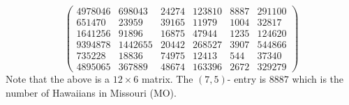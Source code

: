 \documentclass{ximera}
\begin{document}
\begin{example}
\begin{explanation}
\[\begin{pmatrix}
  4978046 & 698043 & 24274 & 123810 & 8887 & 291100\\
  651470 & 23959 & 39165 & 11979 & 1004 & 32817\\
  1641256 & 91896 & 16875 & 47944 & 1235 & 124620\\
  9394878 & 1442655 & 20442 & 268527 & 3907 & 544866\\
  735228 & 18836 & 74975 & 12413 & 544 & 37340\\
  4895065 & 367889 & 48674 & 163396 & 2672 & 329279
  \end{pmatrix}
  \]
  Note that the above is a $12\times 6$ matrix. The $(7, 5)$- entry is $8887$ which is the number of Hawaiians in Missouri (MO).
  \end{explanation}
\end{example}
\end{document}
